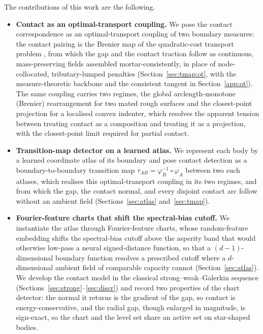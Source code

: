 \documentclass{svjour3}                 %
\newcommand{\tmap}{\tau_{AB}}
\newcommand{\map}[1]{\varphi_{#1}}
\begin{document}
The contributions of this work are the following.
\begin{itemize}[leftmargin=*]
\item \textbf{Contact as an optimal-transport coupling.} We pose the contact correspondence as an
optimal-transport coupling of two boundary measures: the contact pairing is the Brenier map of the quadratic-cost
transport problem \citep{brenier1991polar,mccann1995existence}, from which the gap and the contact traction follow
as continuous, mass-preserving fields assembled mortar-consistently, in place of node-collocated, tributary-lumped
penalties (Section~\ref{sec:tmap:ot}, with the measure-theoretic backbone and the consistent tangent in
Section~\ref{app:ot}). The same coupling carries two regimes, the global arclength-monotone
(Brenier) rearrangement for two mated rough surfaces and the closest-point projection for a localised convex
indenter, which resolves the apparent tension between treating contact as a composition and treating it as a
projection, with the closest-point limit required for partial contact.

\item \textbf{Transition-map detector on a learned atlas.} We represent each body by a learned coordinate atlas of
its boundary and pose contact detection as a boundary-to-boundary transition map $\tmap=\map{B}^{-1}\circ\map{A}$
between two such atlases, which realises this optimal-transport coupling in its two regimes, and from which the
gap, the contact normal, and every disjoint contact arc follow without an ambient field
(Sections~\ref{sec:atlas} and~\ref{sec:tmap}).

\item \textbf{Fourier-feature charts that shift the spectral-bias cutoff.} We instantiate the atlas through Fourier-feature
charts, whose random-feature embedding shifts the spectral-bias cutoff above the asperity band that would
otherwise low-pass a neural signed-distance function, so that a $(d{-}1)$-dimensional boundary function resolves a prescribed cutoff where a $d$-dimensional
ambient field of comparable capacity cannot (Section~\ref{sec:atlas}). We develop the contact model in the
classical strong--weak--Galerkin sequence (Sections~\ref{sec:strong}--\ref{sec:discr}) and record two properties
of the chart detector: the normal it returns is the gradient of the gap, so contact is energy-conservative, and
the radial gap, though enlarged in magnitude, is sign-exact, so the chart and the level set share an active set on
star-shaped bodies.


\end{itemize}
\end{document}
